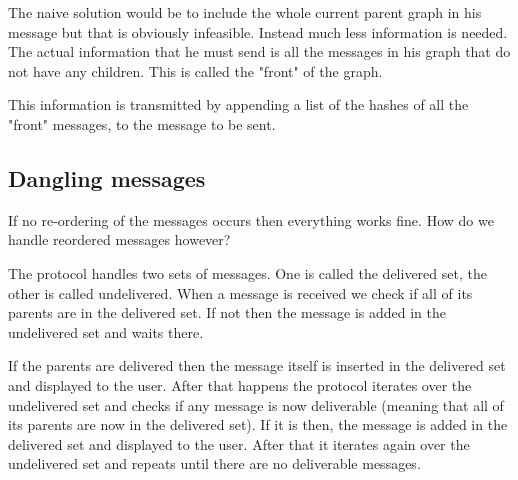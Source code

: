 The naive solution would be to include the whole current parent graph in his message but that is obviously infeasible.
Instead much less information is needed.
The actual information that he must send is all the messages in his graph that do not have any children.
This is called the "front" of the graph.

This information is transmitted by appending a list of the hashes of all the "front" messages, to the message to be sent.

\subsection{Dangling messages}

If no re-ordering of the messages occurs then everything works fine.
How do we handle reordered messages however?

The protocol handles two sets of messages.
One is called the delivered set, the other is called undelivered.
When a message is received we check if all of its parents are in the delivered set.
If not then the message is added in the undelivered set and waits there.

If the parents are delivered then the message itself is inserted in the delivered  set and displayed to the user.
After that happens the protocol iterates over the undelivered set and checks if any message is now deliverable (meaning that all of its parents are now in the delivered set).
If it is then, the message is added in the delivered set and displayed to the user.
After that it iterates again over the undelivered set and repeats until there are no deliverable messages.
